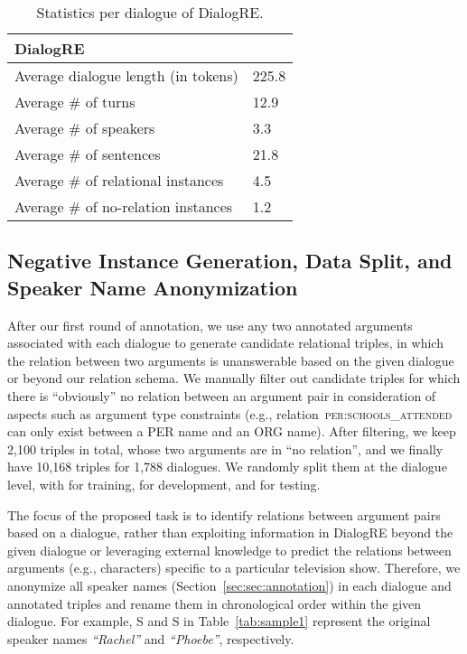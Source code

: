 \documentclass[11pt,a4paper]{article}
\newcommand{\eg}{{e.g.}}
\begin{document}
\begin{table}[h!]
\centering
\footnotesize
\begin{tabular}{ll}
\toprule
\textbf{DialogRE}    & \\
\midrule
Average dialogue length (in tokens)  &  225.8  \\
Average \# of turns                  &  12.9   \\
Average \# of speakers               &  3.3    \\
Average \# of sentences              &  21.8  \\
Average \# of relational instances   &  4.5     \\
Average \# of no-relation instances  &  1.2   \\
\bottomrule
\end{tabular}
\caption{Statistics per dialogue of DialogRE.}
\label{tab:statistics}
\end{table}

\subsection{Negative Instance Generation, Data Split, and Speaker Name Anonymization}

After our first round of annotation, we use any two annotated arguments associated with each dialogue to generate candidate relational triples, in which the relation between two arguments is unanswerable based on the given dialogue or beyond our relation schema. We manually filter out candidate triples for which there is ``obviously'' no relation between an argument pair in consideration of aspects such as argument type constraints (\eg, relation~\textsc{per:schools\_attended} can only exist between a PER name and an ORG name). After filtering, we keep 2,100 triples in total, whose two arguments are in ``no relation'', and we finally have 10,168 triples for 1,788 dialogues. We randomly split them at the dialogue level, with  for training,  for development, and  for testing.





The focus of the proposed task is to identify relations between argument pairs based on a dialogue, rather than exploiting information in DialogRE beyond the given dialogue or leveraging external knowledge to predict the relations between arguments (\eg, characters) specific to a particular television show. Therefore, we anonymize all speaker names (Section~\ref{sec:sec:annotation}) in each dialogue and annotated triples and rename them in chronological order within the given dialogue. For example, S and S in Table~\ref{tab:sample1} represent the original speaker names \emph{``Rachel''} and \emph{``Phoebe''}, respectively. 
\end{document}

